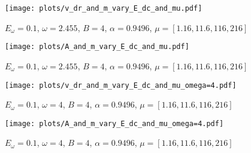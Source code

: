 \documentclass[40pt,letterpaper,physrev]{article}
\begin{document}
	\newpage	
	\begin{figure}[t]
	  \centering
	  \normalsize %
	  
	  \label{fig:negative_absorption_time_plot}
	  \caption{}
	\end{figure}	
	\begin{figure}[H]
	  \centering
	  \normalsize %
	  
	  \label{fig:negative_absorption_time_plot_zoom}
	  \caption{}
	\end{figure}	
	\begin{figure}[t]
	  \centering
	  \normalsize %
	  
	  \label{fig:positive_absorption_time_plot}
	  \caption{}
	\end{figure}	
	\begin{figure}[H]
	  \centering
	  \normalsize %
	  
	  \label{fig:positive_absorption_time_plot_zoom}
	  \caption{}
	\end{figure}	
	\newpage	
	\begin{figure}[t]
	  \centering
	  \normalsize %
	  \texttt{[image: plots/v\_dr\_and\_m\_vary\_E\_dc\_and\_mu.pdf]}
	  \caption{$E_\omega=0.1$, $\omega=2.455$, $B=4$, $\alpha=0.9496$, $\mu=[1.16, 11.6, 116, 216]$}
	  \label{fig:effect_of_temperature_in_v_dr_vary_E_dc_omega=2.455}	  
	\end{figure}	
	\begin{figure}[H]
	  \centering
	  \normalsize %
	  \texttt{[image: plots/A\_and\_m\_vary\_E\_dc\_and\_mu.pdf]}
	  \caption{$E_\omega=0.1$, $\omega=2.455$, $B=4$, $\alpha=0.9496$, $\mu=[1.16, 11.6, 116, 216]$}
	  \label{fig:effect_of_temperature_in_A_vary_E_dc_omega=2.455}
	\end{figure}	
	\newpage	
	\begin{figure}[t]
	  \centering
	  \normalsize %
	  \texttt{[image: plots/v\_dr\_and\_m\_vary\_E\_dc\_and\_mu\_omega=4.pdf]}
	  \caption{$E_\omega=0.1$, $\omega=4$, $B=4$, $\alpha=0.9496$, $\mu=[1.16, 11.6, 116, 216]$}
	  \label{fig:effect_of_temperature_in_v_dr_vary_E_dc_omega=4}	  
	\end{figure}	
	\begin{figure}[H]
	  \centering
	  \normalsize %
	  \texttt{[image: plots/A\_and\_m\_vary\_E\_dc\_and\_mu\_omega=4.pdf]}
	  \caption{$E_\omega=0.1$, $\omega=4$, $B=4$, $\alpha=0.9496$, $\mu=[1.16, 11.6, 116, 216]$}
	  \label{fig:effect_of_temperature_in_A_vary_E_dc_omega=4}
	\end{figure}	
\end{document}
